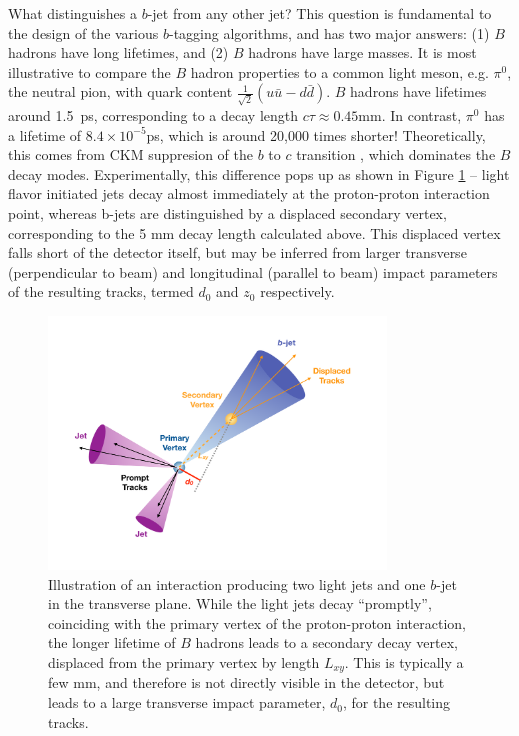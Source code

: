 What distinguishes a $b$-jet from any other jet? This question is fundamental to the design of the various $b$-tagging 
algorithms, and has two major answers: (1) $B$ hadrons have long lifetimes, and (2) $B$ hadrons have large masses. 
It is most illustrative to compare the $B$ hadron properties to a common light meson, e.g. $\pi^{0}$, the neutral 
pion, with quark content $\frac{1}{\sqrt{2}}(u\bar{u}-d\bar{d})$. $B$ hadrons have lifetimes around \SI{1.5}{\ps},
corresponding to a decay length $c\tau\approx 0.45$mm. In contrast, $\pi^0$ has a lifetime of $8.4\times 10^{-5}$ps, 
which is around 20,000 times shorter! Theoretically, this comes from CKM suppresion of the $b$ to $c$ transition , which dominates the $B$ decay modes. Experimentally, this difference pops up as shown in 
Figure \ref{fig:bjet-diagram} -- light flavor initiated jets decay almost immediately at the proton-proton 
interaction point, whereas b-jets are distinguished by a displaced secondary vertex, corresponding to the 5 mm decay 
length calculated above. This displaced vertex falls short of the detector itself, but may be inferred from larger 
transverse (perpendicular to beam) and longitudinal (parallel to beam) impact parameters of the resulting tracks, 
termed $d_{0}$ and $z_{0}$ respectively.

\begin{figure}[ht]
\centering
\includegraphics[width=0.8\textwidth]{figures/bjet-diagram.pdf}
\caption{\label{fig:bjet-diagram} Illustration of an interaction producing two light jets and one $b$-jet 
in the transverse plane. While the light jets decay ``promptly'', coinciding with the primary vertex of the 
proton-proton interaction, the longer lifetime of $B$ hadrons leads to a secondary decay vertex, displaced from 
the primary vertex by length $L_{xy}$. This is typically a few mm, and therefore is not directly visible in the 
detector, but leads to a large transverse impact parameter, $d_{0}$, for the resulting tracks.~\cite{bjettrigger}}
\end{figure}

